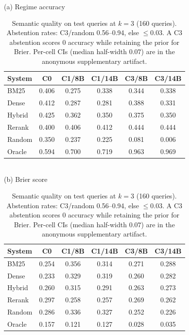 \begin{table}[t]
\centering
\caption{Semantic quality on test queries at $k=3$ (160 queries). Abstention rates: C3/random 0.56--0.94, else $\le 0.03$. A C3 abstention scores $0$ accuracy while retaining the prior for Brier. Per-cell CIs (median half-width $0.07$) are in the anonymous supplementary artifact.}
\label{tab:semantic}
(a) Regime accuracy\\[2pt]
{\small\setlength{\tabcolsep}{4pt}
\begin{tabular}{lccccc}
\toprule
System & C0 & C1/8B & C1/14B & C3/8B & C3/14B \\
\midrule
BM25 & 0.406 & 0.275 & 0.338 & 0.344 & 0.338 \\
Dense & 0.412 & 0.287 & 0.281 & 0.388 & 0.331 \\
Hybrid & 0.425 & 0.362 & 0.350 & 0.375 & 0.350 \\
Rerank & 0.400 & 0.406 & 0.412 & 0.444 & 0.444 \\
Random & 0.350 & 0.237 & 0.225 & 0.081 & 0.006 \\
Oracle & 0.594 & 0.700 & 0.719 & 0.963 & 0.969 \\
\bottomrule
\end{tabular}
}
\\[6pt](b) Brier score\\[2pt]
{\small\setlength{\tabcolsep}{4pt}
\begin{tabular}{lccccc}
\toprule
System & C0 & C1/8B & C1/14B & C3/8B & C3/14B \\
\midrule
BM25 & 0.254 & 0.356 & 0.314 & 0.271 & 0.288 \\
Dense & 0.233 & 0.329 & 0.319 & 0.260 & 0.282 \\
Hybrid & 0.260 & 0.315 & 0.291 & 0.263 & 0.273 \\
Rerank & 0.297 & 0.258 & 0.257 & 0.269 & 0.262 \\
Random & 0.286 & 0.336 & 0.327 & 0.252 & 0.226 \\
Oracle & 0.157 & 0.121 & 0.127 & 0.028 & 0.035 \\
\bottomrule
\end{tabular}
}
\end{table}
